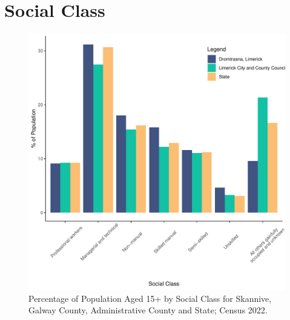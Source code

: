 \documentclass{article}
\begin{document}
\section{Social Class}\label{sect:SC}
\begin{figure}[H]
	\centering
	\includegraphics[width = 140mm]{../figures/SocialClassED.pdf}
	\caption{Percentage of Population Aged 15+ by Social Class for Skannive, Galway County, Administrative County and State; Census 2022.}
	\label{fig:vbnv}
	\end{figure}
\end{document}
